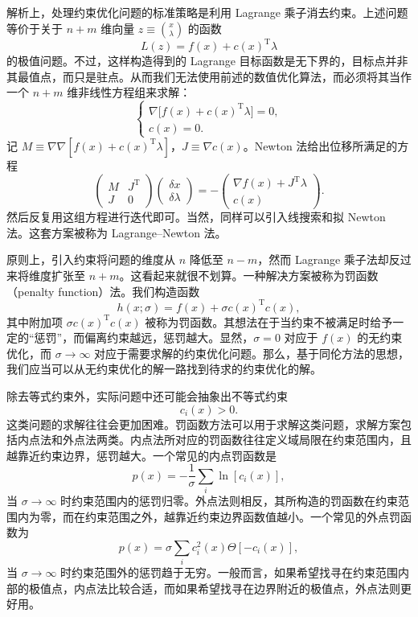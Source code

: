 解析上，处理约束优化问题的标准策略是利用 Lagrange 乘子消去约束。上述问题等价于关于 $n+m$ 维向量 $z\equiv\binom{x}{\lambda}$ 的函数
\begin{equation}
L(z)=f(x)+c(x)^{\mathrm T}\lambda
\tag{4.2.17}
\end{equation}
的极值问题。不过，这样构造得到的 Lagrange 目标函数是无下界的，目标点并非其最值点，而只是驻点。从而我们无法使用前述的数值优化算法，而必须将其当作一个 $n+m$ 维非线性方程组来求解：
\begin{equation}
\begin{cases}
\nabla\!\bigl[f(x)+c(x)^{\mathrm T}\lambda\bigr]=0,\\
c(x)=0.
\end{cases}
\tag{4.2.18}
\end{equation}
记 $M\equiv\nabla\nabla[f(x)+c(x)^{\mathrm T}\lambda]$，$J\equiv\nabla c(x)$。Newton 法给出位移所满足的方程
\begin{equation}
\begin{pmatrix}M&J^{\mathrm T}\\J&0\end{pmatrix}
\begin{pmatrix}\delta x\\\delta\lambda\end{pmatrix}
=-\begin{pmatrix}\nabla f(x)+J^{\mathrm T}\lambda\\c(x)\end{pmatrix}.
\tag{4.2.19}
\end{equation}
然后反复用这组方程进行迭代即可。当然，同样可以引入线搜索和拟 Newton 法。这套方案被称为 Lagrange--Newton 法。

原则上，引入约束将问题的维度从 $n$ 降低至 $n-m$，然而 Lagrange 乘子法却反过来将维度扩张至 $n+m$。这看起来就很不划算。一种解决方案被称为罚函数（penalty function）法。我们构造函数
\begin{equation}
h(x;\sigma)=f(x)+\sigma c(x)^{\mathrm T}c(x),
\tag{4.2.20}
\end{equation}
其中附加项 $\sigma c(x)^{\mathrm T}c(x)$ 被称为罚函数。其想法在于当约束不被满足时给予一定的“惩罚”，而偏离约束越远，惩罚越大。显然，$\sigma=0$ 对应于 $f(x)$ 的无约束优化，而 $\sigma\to\infty$ 对应于需要求解的约束优化问题。那么，基于同伦方法的思想，我们应当可以从无约束优化的解一路找到待求的约束优化的解。

除去等式约束外，实际问题中还可能会抽象出不等式约束
\begin{equation}
c_i(x)>0.
\tag{4.2.21}
\end{equation}
这类问题的求解往往会更加困难。罚函数方法可以用于求解这类问题，求解方案包括内点法和外点法两类。内点法所对应的罚函数往往定义域局限在约束范围内，且越靠近约束边界，惩罚越大。一个常见的内点罚函数是
\[
p(x)=-\frac1\sigma\sum_i\ln[c_i(x)],
\]
当 $\sigma\to\infty$ 时约束范围内的惩罚归零。外点法则相反，其所构造的罚函数在约束范围内为零，而在约束范围之外，越靠近约束边界函数值越小。一个常见的外点罚函数为
\[
p(x)=\sigma\sum_i c_i^2(x)\Theta[-c_i(x)],
\]
当 $\sigma\to\infty$ 时约束范围外的惩罚趋于无穷。一般而言，如果希望找寻在约束范围内部的极值点，内点法比较合适，而如果希望找寻在边界附近的极值点，外点法则更好用。


